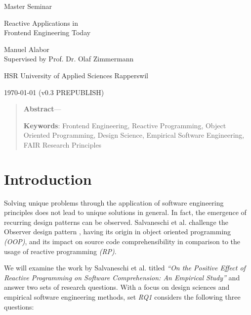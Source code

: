 \documentclass[12pt,a4paper]{article}
\newcommand{\version}{v0.3 PREPUBLISH}
\begin{document}
\begin{centering}
	\Large{Master Seminar}
	\par
	\Huge{Reactive Applications in\\Frontend Engineering Today}
	\par
	\vspace{2ex}

	\normalsize{
		Manuel Alabor\\
		Supervised by Prof. Dr. Olaf Zimmermann\\
		\par
		\vspace{2ex}
		HSR University of Applied Sciences Rapperswil\\
		\par
		\vspace{2ex}
		\today{} (\version)
	}
	\par
	\vspace{2ex}

	\begin{quotation}
		\small{
			\noindent\textbf{Abstract}---
		}
		\par
		\vspace{2ex}

		\small{
			\noindent\textbf{Keywords}: Frontend Engineering, Reactive Programming, Object Oriented Programming, Design Science, Empirical Software Engineering, FAIR Research Principles
		}
		\par
		\vspace{4ex}
	\end{quotation}
\end{centering}

\section{Introduction}
Solving unique problems through the application of software engineering principles does not lead to unique solutions in general. In fact, the emergence of recurring design patterns can be observed. Salvaneschi et al. \cite{7827078} challenge the Observer design pattern \cite{gamma1995design}, having its origin in object oriented programming \emph{(OOP)}, and its impact on source code comprehensibility in comparison to the usage of reactive programming \emph{(RP)}.

We will examine the work by Salvaneschi et al. titled \emph{``On the Positive Effect of Reactive Programming on Software Comprehension: An Empirical Study''} \cite{7827078} and answer two sets of research questions. With a focus on design sciences and empirical software engineering methods, set \emph{RQ1} considers the following three questions:
\end{document}
